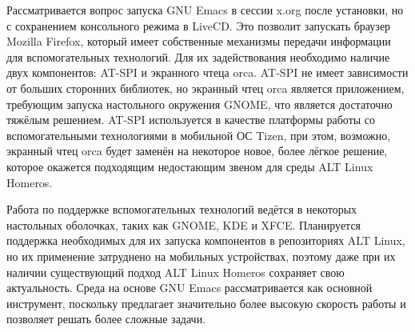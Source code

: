 \documentclass[10pt, a5paper]{article}
\begin{document}
Рассматривается вопрос запуска GNU Emacs в сессии x.org после установки, но с сохранением консольного режима в LiveCD. Это позволит запускать браузер Mozilla Firefox, который имеет собственные механизмы передачи информации для вспомогательных технологий. Для их задействования необходимо наличие двух 
компонентов: AT-SPI и экранного чтеца orca. AT-SPI не имеет зависимости от больших сторонних библиотек, но экранный чтец orca является приложением, требующим запуска настольного окружения GNOME, что является достаточно тяжёлым решением. AT-SPI используется в качестве платформы работы со вспомогательными технологиями в мобильной ОС Tizen, при этом, возможно, экранный чтец orca будет заменён на некоторое новое, более лёгкое решение, которое окажется подходящим недостающим звеном для среды ALT Linux Homeros.

Работа по поддержке вспомогательных технологий ведётся в некоторых настольных оболочках, таких как GNOME, KDE и XFCE. Планируется поддержка необходимых для их запуска компонентов в репозиториях ALT Linux, но их применение затруднено на мобильных устройствах, поэтому даже при их наличии существующий подход ALT Linux Homeros сохраняет свою актуальность. Среда на основе GNU Emacs рассматривается как основной инструмент, поскольку предлагает значительно более высокую скорость работы и позволяет решать более сложные задачи.
\end{document}

